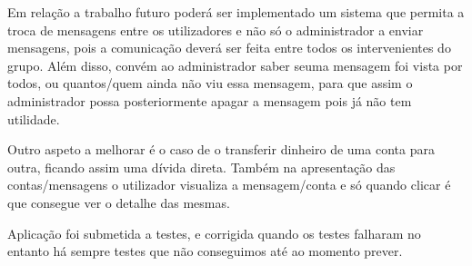 Em relação a trabalho futuro poderá ser implementado um sistema que permita a troca de mensagens entre os utilizadores e não só o administrador a enviar mensagens, pois a comunicação deverá ser feita entre todos os intervenientes do grupo. Além disso, convém ao administrador saber seuma mensagem foi vista por todos, ou quantos/quem ainda não viu essa mensagem, para que assim o administrador possa posteriormente apagar a mensagem pois já não tem utilidade. 

Outro aspeto a melhorar é o caso de o transferir dinheiro de uma conta para outra, ficando assim uma dívida direta. Também na apresentação das contas/mensagens o utilizador visualiza a mensagem/conta e só quando clicar é que consegue ver o detalhe das mesmas. 

Aplicação foi submetida a testes, e  corrigida quando os testes falharam no entanto há sempre testes que não conseguimos até ao momento prever. 
